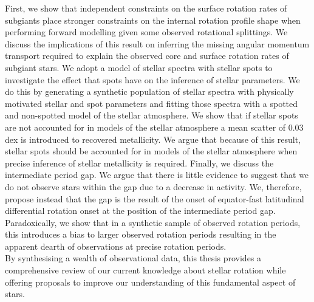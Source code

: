 {First, we show that independent constraints on the surface rotation rates of subgiants place stronger constraints on the internal rotation profile shape when performing forward modelling given some observed rotational splittings. We discuss the implications of this result on inferring the missing angular momentum transport required to explain the observed core and surface rotation rates of subgiant stars.
We adopt a model of stellar spectra with stellar spots to investigate the effect that spots have on the inference of stellar parameters. We do this by generating a synthetic population of stellar spectra with physically motivated stellar and spot parameters and fitting those spectra with a spotted and non-spotted model of the stellar atmosphere. We show that if stellar spots are not accounted for in models of the stellar atmosphere a mean scatter of 0.03 dex is introduced to recovered metallicity. We argue that because of this result, stellar spots should be accounted for in models of the stellar atmosphere when precise inference of stellar metallicity is required.
Finally, we discuss the intermediate period gap. We argue that there is little evidence to suggest that we do not observe stars within the gap due to a decrease in activity. We, therefore, propose instead that the gap is the result of the onset of equator-fast latitudinal differential rotation onset at the position of the intermediate period gap. Paradoxically, we show that in a synthetic sample of observed rotation periods, this introduces a bias to larger observed rotation periods resulting in the apparent dearth of observations at precise rotation periods.\\

By synthesising a wealth of observational data, this thesis provides a comprehensive review of our current knowledge about stellar rotation while offering proposals to improve our understanding of this fundamental aspect of stars.
}



